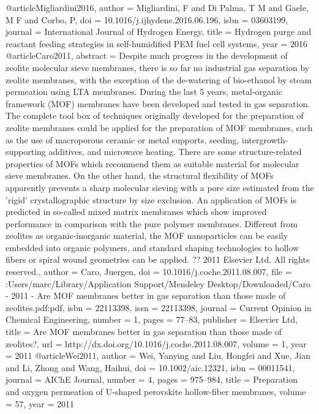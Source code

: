 @article{Migliardini2016,
author = {Migliardini, F and {Di Palma}, T M and Gaele, M F and Corbo, P},
doi = {10.1016/j.ijhydene.2016.06.196},
isbn = {03603199},
journal = {International Journal of Hydrogen Energy},
title = {{Hydrogen purge and reactant feeding strategies in self-humidified PEM fuel cell systems}},
year = {2016}
}
@article{Caro2011,
abstract = {Despite much progress in the development of zeolite molecular sieve membranes, there is so far no industrial gas separation by zeolite membranes, with the exception of the de-watering of bio-ethanol by steam permeation using LTA membranes. During the last 5 years, metal-organic framework (MOF) membranes have been developed and tested in gas separation. The complete tool box of techniques originally developed for the preparation of zeolite membranes could be applied for the preparation of MOF membranes, such as the use of macroporous ceramic or metal supports, seeding, intergrowth-supporting additives, and microwave heating. There are some structure-related properties of MOFs which recommend them as suitable material for molecular sieve membranes. On the other hand, the structural flexibility of MOFs apparently prevents a sharp molecular sieving with a pore size estimated from the 'rigid' crystallographic structure by size exclusion. An application of MOFs is predicted in so-called mixed matrix membranes which show improved performance in comparison with the pure polymer membranes. Different from zeolites as organic-inorganic material, the MOF nanoparticles can be easily embedded into organic polymers, and standard shaping technologies to hollow fibers or spiral wound geometries can be applied. ?? 2011 Elsevier Ltd. All rights reserved.},
author = {Caro, Juergen},
doi = {10.1016/j.coche.2011.08.007},
file = {:Users/marc/Library/Application Support/Mendeley Desktop/Downloaded/Caro - 2011 - Are MOF membranes better in gas separation than those made of zeolites.pdf:pdf},
isbn = {22113398},
issn = {22113398},
journal = {Current Opinion in Chemical Engineering},
number = {1},
pages = {77--83},
publisher = {Elsevier Ltd},
title = {{Are MOF membranes better in gas separation than those made of zeolites?}},
url = {http://dx.doi.org/10.1016/j.coche.2011.08.007},
volume = {1},
year = {2011}
}
@article{Wei2011,
author = {Wei, Yanying and Liu, Hongfei and Xue, Jian and Li, Zhong and Wang, Haihui},
doi = {10.1002/aic.12321},
isbn = {00011541},
journal = {AIChE Journal},
number = {4},
pages = {975--984},
title = {{Preparation and oxygen permeation of U-shaped perovskite hollow-fiber membranes}},
volume = {57},
year = {2011}
}
